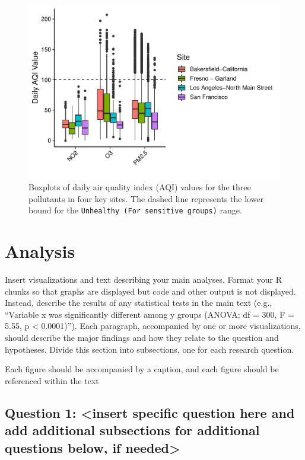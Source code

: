 \documentclass[12pt,]{article}
\begin{document}
\begin{figure}
\centering
\includegraphics{Project_Template_files/figure-latex/unnamed-chunk-2-1.pdf}
\caption{Boxplots of daily air quality index (AQI) values for the three
pollutants in four key sites. The dashed line represents the lower bound
for the \texttt{Unhealthy\ (For\ sensitive\ groups)} range.}
\end{figure}

\newpage

\hypertarget{analysis}{%
\section{Analysis}\label{analysis}}

Insert visualizations and text describing your main analyses. Format
your R chunks so that graphs are displayed but code and other output is
not displayed. Instead, describe the results of any statistical tests in
the main text (e.g., ``Variable x was significantly different among y
groups (ANOVA; df = 300, F = 5.55, p \textless{} 0.0001)''). Each
paragraph, accompanied by one or more visualizations, should describe
the major findings and how they relate to the question and hypotheses.
Divide this section into subsections, one for each research question.

Each figure should be accompanied by a caption, and each figure should
be referenced within the text

\hypertarget{question-1-insert-specific-question-here-and-add-additional-subsections-for-additional-questions-below-if-needed}{%
\subsection{Question 1: \textless{}insert specific question here and add
additional subsections for additional questions below, if
needed\textgreater{}}\label{question-1-insert-specific-question-here-and-add-additional-subsections-for-additional-questions-below-if-needed}}
\end{document}

